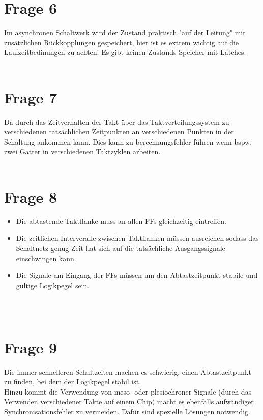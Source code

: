 \documentclass[a4paper]{scrartcl}
\newcounter{punkte}
\begin{document}
\section*{Frage 6}
Im asynchronen Schaltwerk wird der Zustand praktisch "auf der Leitung" mit zusätzlichen Rückkopplungen gespeichert, hier ist es extrem wichtig auf die Laufzeitbedinungen zu achten! Es gibt keinen Zustands-Speicher mit Latches.
~\\
~\\
\section*{Frage 7}
Da durch das Zeitverhalten der Takt über das Taktverteilungssystem zu verschiedenen tatsächlichen Zeitpunkten an verschiedenen Punkten in der Schaltung ankommen kann. Dies kann zu berechnungsfehler führen wenn bspw. zwei Gatter in verschiedenen Taktzyklen arbeiten.
~\\
~\\
\section*{Frage 8}
\begin{itemize}
	\item Die abtastende Taktflanke muss an allen FFs gleichzeitig eintreffen.
	\item Die zeitlichen Interveralle zwischen Taktflanken müssen ausreichen sodass das Schaltnetz genug Zeit hat sich auf die tatsächliche Ausgangssignale einschwingen kann.
	\item Die Signale am Eingang der FFs müssen um den Abtastzeitpunkt stabile und gültige Logikpegel sein.
\end{itemize}
~\\
~\\
\section*{Frage 9}
Die immer schnelleren Schaltzeiten machen es schwierig, einen Abtastzeitpunkt zu finden, bei dem der Logikpegel stabil ist.\\
Hinzu kommt die Verwendung von meso- oder plesiochroner Signale (durch das Verwenden verschiedener Takte auf einem Chip) macht es ebenfalls aufwändiger Synchronisationsfehler zu vermeiden. Dafür sind spezielle Lösungen notwendig.\\

~\\
~\\
\end{document}
